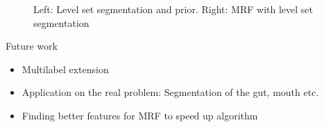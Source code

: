 \documentclass[mathserif,final,hyperref={pdfpagelabels=false}]{beamer} %
\begin{document}
\begin{frame}
\begin{columns}
\begin{column2lti}
\begin{examplelti}
\begin{figure}[t]
  \centering
{}  
  
\caption{Left: Level set segmentation and prior.  Right: MRF with level set segmentation}
\label{Individual results}
 \end{figure}


\end{examplelti}


\begin{blocklti}{Future work}
\begin{itemize}
\item Multilabel extension
\item Application on the real problem: Segmentation of the gut, mouth etc.
\item Finding better features for MRF to speed up algorithm 
\end{itemize}

\end{blocklti}

\end{column2lti}

\end{columns}
\end{frame}
\end{document}
